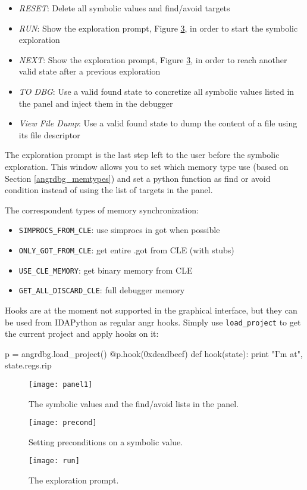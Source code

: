 \begin{itemize}
\item {\em RESET}: Delete all symbolic values and find/avoid targets
\item {\em RUN}: Show the exploration prompt, Figure \ref{fig:run}, in order to start the symbolic exploration
\item {\em NEXT}: Show the exploration prompt, Figure \ref{fig:run}, in order to reach another valid state after a previous exploration
\item {\em TO DBG}: Use a valid found state to concretize all symbolic values listed in the panel and inject them in the debugger
\item {\em View File Dump}: Use a valid found state to dump the content of a file using its file descriptor
\end{itemize}

The exploration prompt is the last step left to the user before the symbolic exploration. This window allows you to set which memory type use (based on Section \ref{angrdbg_memtypes}) and set a python function as find or avoid condition instead of using the list of targets in the panel.

The correspondent types of memory synchronization:

\begin{itemize}
\item \verb|SIMPROCS_FROM_CLE|: use simprocs in got when possible
\item \verb|ONLY_GOT_FROM_CLE|: get entire .got from CLE (with stubs)
\item \verb|USE_CLE_MEMORY|: get binary memory from CLE
\item \verb|GET_ALL_DISCARD_CLE|: full debugger memory
\end{itemize}

Hooks are at the moment not supported in the graphical interface, but they can be used from IDAPython as regular angr hooks. Simply use \verb|load_project| to get the current project and apply hooks on it:

\begin{py_code}
p = angrdbg.load_project()
@p.hook(0xdeadbeef)
def hook(state):
    print "I'm at", state.regs.rip
\end{py_code}

\begin{figure}[H]
  \caption{The symbolic values and the find/avoid lists in the panel.}
  \centering
  \texttt{[image: panel1]}
  \label{fig:panel1}
\end{figure}
\begin{figure}[H]
  \caption{Setting preconditions on a symbolic value.}
  \centering
  \texttt{[image: precond]}
  \label{fig:precond}
\end{figure}
\begin{figure}[H]
  \caption{The exploration prompt.}
  \centering
  \texttt{[image: run]}
  \label{fig:run}
\end{figure}

